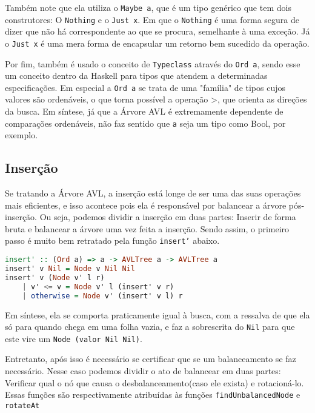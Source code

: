 Também note que ela utiliza o \texttt{Maybe a}, que é um tipo genérico que tem dois construtores: O \texttt{Nothing} e o \texttt{Just x}. Em que o \texttt{Nothing} é uma forma segura de dizer que não há correspondente ao que se procura, semelhante à uma exceção. Já o \texttt{Just x} é uma mera forma de encapsular um retorno bem sucedido da operação.

Por fim, também é usado o conceito de \texttt{Typeclass} através do \texttt{Ord a}, sendo esse um conceito dentro da Haskell para tipos que atendem a determinadas especificações. Em especial a \texttt{Ord a} se trata de uma "família" de tipos cujos valores são ordenáveis, o que torna possível a operação >, que orienta as direções da busca. Em síntese, já que a Árvore AVL é extremamente dependente de comparações ordenáveis, não faz sentido que \texttt{a} seja um tipo como Bool, por exemplo.
\subsection{Inserção}

Se tratando a Árvore AVL, a inserção está longe de ser uma das suas operações mais eficientes, e isso acontece pois ela é responsável por balancear a árvore pós-inserção. Ou seja, podemos dividir a inserção em duas partes: Inserir de forma bruta e balancear a árvore uma vez feita a inserção. Sendo assim, o primeiro passo é muito bem retratado pela função \texttt{insert'} abaixo.

\begin{lstlisting}[language=haskell]
insert' :: (Ord a) => a -> AVLTree a -> AVLTree a
insert' v Nil = Node v Nil Nil
insert' v (Node v' l r)
    | v' <= v = Node v' l (insert' v r)
    | otherwise = Node v' (insert' v l) r
\end{lstlisting}

Em síntese, ela se comporta praticamente igual à busca, com a ressalva de que ela só para quando chega em uma folha vazia, e faz a sobrescrita do \texttt{Nil} para que este vire um \texttt{Node (valor Nil Nil)}.

Entretanto, após isso é necessário se certificar que se um balanceamento se faz necessário. Nesse caso podemos dividir o ato de balancear em duas partes: Verificar qual o nó que causa o desbalanceamento(caso ele exista) e rotacioná-lo. Essas funções são respectivamente atribuídas às funções \texttt{findUnbalancedNode} e \texttt{rotateAt}

